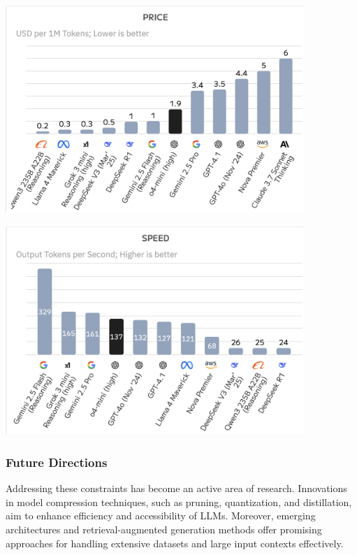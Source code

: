 \begin{center}
    \centering
    \includegraphics[width=0.85\textwidth]{Images/price_LLM_comparison.png}
     \cite{llmPriceComparison}
    \label{fig:llmPriceComparison}
\end{center}

\begin{center}
    \centering
    \includegraphics[width=0.85\textwidth]{Images/speed_LLM_comparison.png}
     \cite{llmSpeedComparison}
    \label{fig:llmSpeedComparison}
\end{center}

\subsubsection{Future Directions}
Addressing these constraints has become an active area of research. Innovations in model compression techniques, such as pruning, quantization, and distillation, aim to enhance efficiency and accessibility of LLMs. Moreover, emerging architectures and retrieval-augmented generation methods offer promising approaches for handling extensive datasets and large input contexts effectively.

